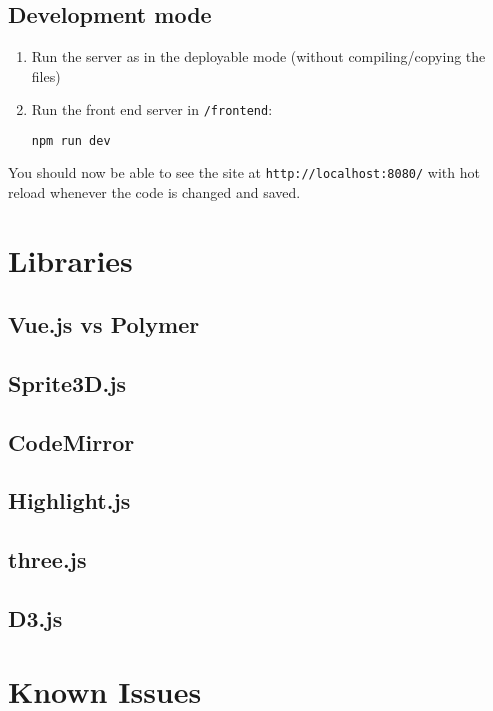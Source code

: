\documentclass[a4paper]{article}
\begin{document}
\subsection{Development mode}
\begin{enumerate}
\item Run the server as in the deployable mode (without compiling/copying the files)
\item Run the front end server in \texttt{/frontend}:
\begin{lstlisting}[language=bash]
npm run dev
\end{lstlisting}
\end{enumerate}
You should now be able to see the site at \texttt{http://localhost:8080/} with hot reload whenever the code is changed and saved.
\begin{multicols}{2}
\section{Libraries}
\subsection{Vue.js vs Polymer}
\subsection{Sprite3D.js}
\subsection{CodeMirror}
\subsection{Highlight.js}
\subsection{three.js}
\subsection{D3.js}
\section{Known Issues}

\end{multicols}
\end{document}

